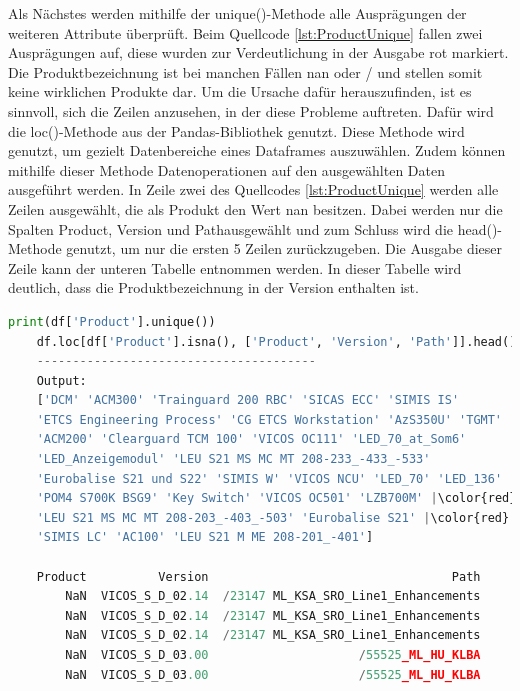 Als Nächstes werden mithilfe der unique()-Methode alle Ausprägungen der weiteren Attribute überprüft. Beim Quellcode \ref*{lst:ProductUnique} fallen zwei Ausprägungen
auf, diese wurden zur Verdeutlichung in der Ausgabe rot markiert. Die Produktbezeichnung ist bei manchen Fällen \glqq nan\grqq{} oder \glqq /\grqq{} und stellen somit
keine wirklichen Produkte dar. Um die Ursache dafür herauszufinden, ist es sinnvoll, sich die Zeilen anzusehen, in der diese Probleme auftreten. Dafür wird die
loc()-Methode aus der Pandas-Bibliothek genutzt. Diese Methode wird genutzt, um gezielt Datenbereiche eines Dataframes auszuwählen. Zudem können mithilfe dieser Methode
Datenoperationen auf den ausgewählten Daten ausgeführt werden. In Zeile zwei des Quellcodes \ref*{lst:ProductUnique} werden alle Zeilen ausgewählt, die als Produkt
den Wert \glqq nan\grqq{} besitzen. Dabei werden nur die Spalten \glqq Product\grqq{}, \glqq Version\grqq{} und \glqq Path\grqq ausgewählt und zum Schluss
wird die head()-Methode genutzt, um nur die ersten 5 Zeilen zurückzugeben. Die Ausgabe dieser Zeile kann der unteren Tabelle entnommen werden.
In dieser Tabelle wird deutlich, dass die Produktbezeichnung in der Version enthalten ist. 

\begin{lstlisting}[language = python, caption={Ausprägungen des Attributs Product},captionpos=b, label = lst:ProductUnique, floatplacement=H, escapechar={|}]
    print(df['Product'].unique())
    df.loc[df['Product'].isna(), ['Product', 'Version', 'Path']].head()
    ---------------------------------------
    Output:
    ['DCM' 'ACM300' 'Trainguard 200 RBC' 'SICAS ECC' 'SIMIS IS'
    'ETCS Engineering Process' 'CG ETCS Workstation' 'AzS350U' 'TGMT'
    'ACM200' 'Clearguard TCM 100' 'VICOS OC111' 'LED_70_at_Som6'
    'LED_Anzeigemodul' 'LEU S21 MS MC MT 208-233_-433_-533'
    'Eurobalise S21 und S22' 'SIMIS W' 'VICOS NCU' 'LED_70' 'LED_136'
    'POM4 S700K BSG9' 'Key Switch' 'VICOS OC501' 'LZB700M' |\color{red}nan|
    'LEU S21 MS MC MT 208-203_-403_-503' 'Eurobalise S21' |\color{red}'/'| 'DTS'
    'SIMIS LC' 'AC100' 'LEU S21 M ME 208-201_-401']

    Product          Version                                  Path
        NaN  VICOS_S_D_02.14  /23147 ML_KSA_SRO_Line1_Enhancements
        NaN  VICOS_S_D_02.14  /23147 ML_KSA_SRO_Line1_Enhancements
        NaN  VICOS_S_D_02.14  /23147 ML_KSA_SRO_Line1_Enhancements
        NaN  VICOS_S_D_03.00                     /55525_ML_HU_KLBA
        NaN  VICOS_S_D_03.00                     /55525_ML_HU_KLBA
\end{lstlisting}

